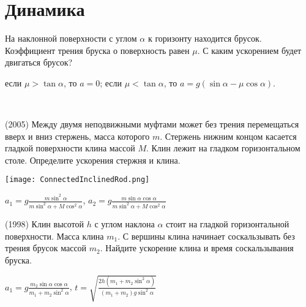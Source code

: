 \section{Динамика}
 
\begin{ex}
На наклонной поверхности с углом $\alpha$ к горизонту находится брусок. 
Коэффициент трения бруска о поверхность равен $\mu$. С каким ускорением будет двигаться брусок?
\begin{ans}
если $\mu > \tan \alpha$, то $a = 0$; если $\mu < \tan \alpha$, то $a = g(\sin \alpha - \mu \cos \alpha)$.
\end{ans}
\end{ex}

\begin{ex}
\hspace{0pt} \\
\begin{minipage}{.65\textwidth}
(2005) Между двумя неподвижными муфтами может без трения перемещаться вверх и вниз стержень, масса которого $m$. Стержень нижним концом касается гладкой поверхности клина массой $M$. Клин лежит на гладком горизонтальном столе. Определите ускорения стержня и клина.
\end{minipage}
\begin{minipage}{.35\textwidth}
\centering
\texttt{[image: ConnectedInclinedRod.png]}
\end{minipage}
\begin{ans}
$a_1 = g \frac{m \sin^2 \alpha}{m \sin^2 \alpha + M \cos^2 \alpha}$, $a_2 = g\frac{m \sin \alpha \cos \alpha}{m \sin^2 \alpha + M \cos^2 \alpha}$
\end{ans}
\end{ex}

\begin{ex}
(1998) Клин высотой $h$ с углом наклона $\alpha$ стоит на гладкой горизонтальной поверхности. Масса клина $m_1$. С вершины клина начинает соскальзывать без трения брусок массой $m_2$. Найдите ускорение клина и время соскальзывания бруска.
\begin{ans}
$a_1 = g \frac{m_2 \sin \alpha \cos \alpha}{m_1 + m_2 \sin^2 \alpha}$, $t=\sqrt{\frac{2h(m_1+m_2\sin^2\alpha)}{(m_1+m_2)g \sin^2 \alpha}}$
\end{ans}
\end{ex}

